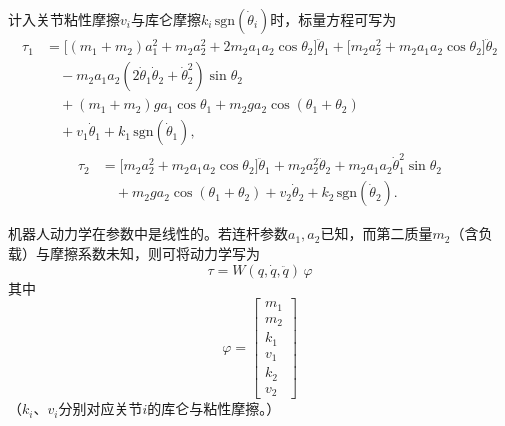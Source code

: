 \documentclass[12pt,a4paper]{ctexart}
\begin{document}
计入关节粘性摩擦$v_i$与库仑摩擦$k_i\,\mathrm{sgn}(\dot{\theta}_i)$时，标量方程可写为
\begin{equation}
\begin{aligned}
\tau_1 &= \bigl[(m_1+m_2)a_1^2 + m_2a_2^2 + 2m_2a_1a_2\cos\theta_2\bigr]\ddot{\theta}_1
 + \bigl[m_2a_2^2 + m_2a_1a_2\cos\theta_2\bigr]\ddot{\theta}_2 \\
 &\quad - m_2a_1a_2(2\dot{\theta}_1\dot{\theta}_2 + \dot{\theta}_2^2)\sin\theta_2 \\
 &\quad + (m_1+m_2)ga_1\cos\theta_1 + m_2ga_2\cos(\theta_1+\theta_2) \\
 &\quad + v_1\dot{\theta}_1 + k_1\,\mathrm{sgn}(\dot{\theta}_1),
\end{aligned}
\end{equation}
\begin{equation}
\begin{aligned}
\tau_2 &= \bigl[m_2a_2^2 + m_2a_1a_2\cos\theta_2\bigr]\ddot{\theta}_1 + m_2a_2^2\ddot{\theta}_2
 + m_2a_1a_2\dot{\theta}_1^2\sin\theta_2 \\
 &\quad + m_2ga_2\cos(\theta_1+\theta_2) + v_2\dot{\theta}_2 + k_2\,\mathrm{sgn}(\dot{\theta}_2).
\end{aligned}
\end{equation}

机器人动力学在参数中是线性的。若连杆参数$a_1,a_2$已知，而第二质量$m_2$（含负载）与摩擦系数未知，则可将动力学写为
\begin{equation}
\tau = W(q,\dot{q},\ddot{q})\,\varphi
\end{equation}
其中
\begin{equation}
\varphi = \begin{bmatrix} m_1 \\ m_2 \\ k_1 \\ v_1 \\ k_2 \\ v_2 \end{bmatrix}
\end{equation}
（$k_i$、$v_i$分别对应关节$i$的库仑与粘性摩擦。）
\end{document}
